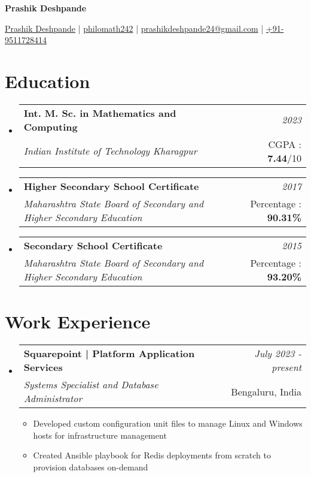 \documentclass[a4paper,10pt]{article}
\makeatletter
\newcommand{\resumeSubheading}[4]{
\vspace{0.3mm}\item
    \begin{tabular*}{0.98\textwidth}[t]{l@{\extracolsep{\fill}}r}
        \textbf{#1} & \textit{\footnotesize{#4}} \\
        \textit{\textrm{#3}} &  \footnotesize{#2}\\
    \end{tabular*}
    \vspace{-2.0mm}
}
\newcommand{\resumeSubHeadingListStart}{\begin{itemize}[leftmargin=*,labelsep=1mm]}
\newcommand{\resumeItemListStart}{\begin{itemize}[leftmargin=*,labelsep=1mm,itemsep=0.5mm]}
\newcommand{\resumeSubHeadingListEnd}{\end{itemize}\vspace{2mm}}
\newcommand{\resumeItemListEnd}{\end{itemize}\vspace{-2mm}}
\newcommand{\socialicon}[1]{\raisebox{-0.05em}{\resizebox{!}{1em}{#1}}}
\newcommand{\headerfontiii}{\fontfamily{ppl}\selectfont} %
\makeatother
\begin{document}
\headerfontiii

\begin{center}
	{\Large\textbf{Prashik Deshpande}}
\end{center}
\vspace{-6mm}



\begin{center}
	\small{
		\socialicon{\faLinkedin} \href{https://www.linkedin.com/in/prashikdeshpande/}{Prashik Deshpande} | 
		\socialicon{\faGithub} \href{https://github.com/philomath242}{philomath242} 
		|
		\socialicon{\faEnvelope} \href{mailto:prashikdeshpande24@gmail.com}{prashikdeshpande24@gmail.com}
		|
		\socialicon{\faMobile} \href{callto:9511728414}{+91-9511728414}
	}
\end{center}




\section{\textbf{Education}}
\vspace{-0.4mm}
\resumeSubHeadingListStart

\resumeSubheading
{Int. M. Sc. in Mathematics and Computing}{CGPA : \textbf{7.44}/10}
{Indian Institute of Technology Kharagpur}{2023}


\resumeSubheading
{Higher Secondary School Certificate}{Percentage : \textbf{90.31\%}}
{Maharashtra State Board of Secondary and Higher Secondary Education}{2017}

\resumeSubheading
{Secondary School Certificate}{Percentage : \textbf{93.20\%}}
{Maharashtra State Board of Secondary and Higher Secondary Education}{2015}

\resumeSubHeadingListEnd
\vspace{-5mm}



\section{\textbf{Work Experience}}
\vspace{-0.4mm}
\resumeSubHeadingListStart
\resumeSubheading
{{Squarepoint | Platform Application Services}}{Bengaluru, India}
{Systems Specialist and Database Administrator}{July 2023 - present}
\resumeItemListStart
\item Developed custom configuration unit files to manage Linux and Windows hosts for infrastructure management
\item Created Ansible playbook for Redis deployments from scratch to provision databases on-demand
\resumeItemListEnd 
\resumeSubHeadingListEnd
\vspace{-6mm}
\end{document}
